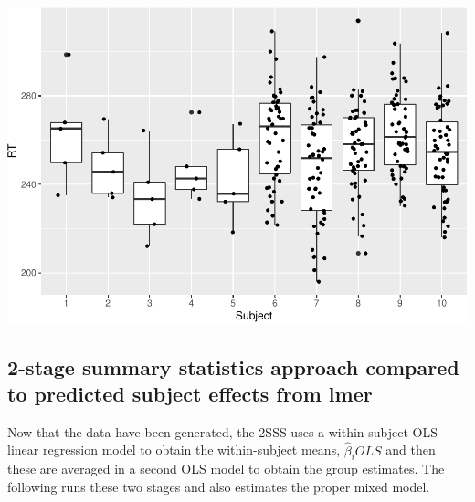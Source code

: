 \documentclass[]{book}
\newenvironment{Shaded}{\begin{snugshade}}{\end{snugshade}}
\newcommand{\KeywordTok}[1]{\textcolor[rgb]{0.13,0.29,0.53}{\textbf{{#1}}}}
\newcommand{\DecValTok}[1]{\textcolor[rgb]{0.00,0.00,0.81}{{#1}}}
\newcommand{\StringTok}[1]{\textcolor[rgb]{0.31,0.60,0.02}{{#1}}}
\newcommand{\CommentTok}[1]{\textcolor[rgb]{0.56,0.35,0.01}{\textit{{#1}}}}
\newcommand{\OtherTok}[1]{\textcolor[rgb]{0.56,0.35,0.01}{{#1}}}
\newcommand{\NormalTok}[1]{{#1}}
\begin{document}
\includegraphics{MixedModelsTutorials_files/figure-latex/unnamed-chunk-9-1.pdf}

\subsection{2-stage summary statistics approach compared to predicted
subject effects from
lmer}\label{stage-summary-statistics-approach-compared-to-predicted-subject-effects-from-lmer}

Now that the data have been generated, the 2SSS uses a within-subject
OLS linear regression model to obtain the within-subject means,
\(\hat\beta_i{OLS}\) and then these are averaged in a second OLS model
to obtain the group estimates. The following runs these two stages and
also estimates the proper mixed model.

\begin{Shaded}
\end{Shaded}
\end{document}
